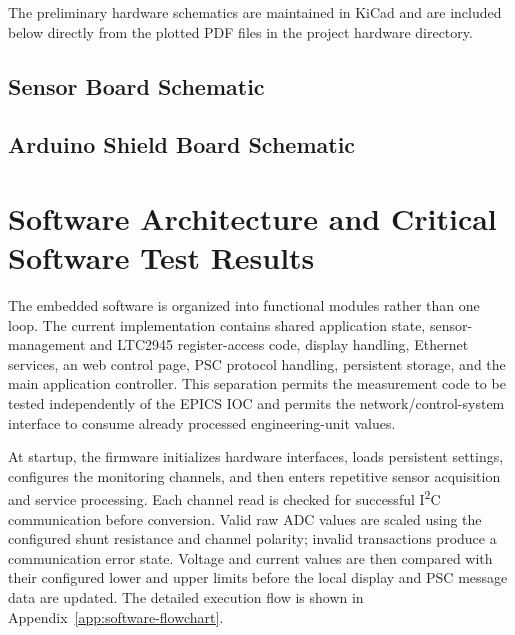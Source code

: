 The preliminary hardware schematics are maintained in KiCad and are included
below directly from the plotted PDF files in the project hardware directory.

\subsection{Sensor Board Schematic}



\subsection{Arduino Shield Board Schematic}




\section{Software Architecture and Critical Software Test Results}
\label{sec:software-architecture-tests}
The embedded software is organized into functional modules rather than one
loop. The current implementation contains shared application state,
sensor-management and LTC2945 register-access code, display handling, Ethernet
services, an web control page, PSC protocol handling, persistent storage, and the
main application controller. This separation permits the measurement code to be
tested independently of the EPICS IOC and permits the network/control-system
interface to consume already processed engineering-unit values.

At startup, the firmware initializes hardware interfaces, loads persistent
settings, configures the monitoring channels, and then enters repetitive sensor
acquisition and service processing. Each channel read is checked for successful
I\textsuperscript{2}C communication before conversion. Valid raw ADC values are
scaled using the configured shunt resistance and channel polarity; invalid
transactions produce a communication error state. Voltage and current values
are then compared with their configured lower and upper limits before the local
display and PSC message data are updated. The detailed execution flow is shown
in Appendix~\ref{app:software-flowchart}.


